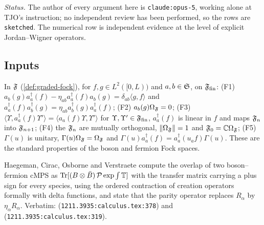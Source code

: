 \emph{Status.} The author of every argument here is \texttt{claude:opus-5}, working alone at
TJO's instruction; no independent review has been performed, so the rows are
\texttt{sketched}. The numerical row is independent evidence at the level of explicit
Jordan--Wigner operators.

\subsection{Inputs}

\begin{assumption}
\label{asm:graded-fock}
In $\mathfrak F$ (\cref{def:graded-fock}), for $f,g\in L^2([0,L))$ and $a,b\in\mathfrak S$, on
$\mathfrak F_{\mathrm{fin}}$: (F1) $a_b(g)a^\dagger_a(f)-\eta_{ab}a^\dagger_a(f)a_b(g)=\delta_{ab}
\langle g,f\rangle$ and $a^\dagger_a(f)a^\dagger_b(g)=\eta_{ab}a^\dagger_b(g)a^\dagger_a(f)$;
(F2) $a_b(g)\Omega_{\mathfrak F}=0$; (F3) $\langle\Upsilon,a^\dagger_a(f)\Upsilon'\rangle=\langle
a_a(f)\Upsilon,\Upsilon'\rangle$ for $\Upsilon,\Upsilon'\in\mathfrak F_{\mathrm{fin}}$, $a^\dagger_a(f)$ is linear in
$f$ and maps $\mathfrak F_n$ into $\mathfrak F_{n+1}$; (F4) the $\mathfrak F_n$ are mutually orthogonal, $\|\Omega_{\mathfrak F}\|=1$ and
$\mathfrak F_0=\mathbb C\Omega_{\mathfrak F}$; (F5) $\Gamma(u)$ is unitary, $\Gamma(u)\Omega_{\mathfrak F}=\Omega_{\mathfrak F}$ and
$\Gamma(u)a^\dagger_a(f)=a^\dagger_a(u_af)\Gamma(u)$. These are the standard properties of
the boson and fermion Fock spaces.
\end{assumption}

\begin{citedfact}
\label{cit:hcov-overlap-parity}
Haegeman, Cirac, Osborne and Verstraete \cite{haegeman2013calculus} compute the overlap of two
boson--fermion cMPS as $\operatorname{Tr}[(B\otimes\bar B)\,\mathcal P\exp\int\mathbb T]$ with the transfer matrix
carrying a plus sign for every species, using the ordered contraction of creation operators
formally with delta functions, and state that the parity operator replaces $R_\alpha$ by %
$\eta_{\alpha}R_\alpha$. %
Verbatim: \texttt{}
(\texttt{1211.3935:calculus.tex:378}) and
\texttt{}
(\texttt{1211.3935:calculus.tex:319}).
\end{citedfact}

